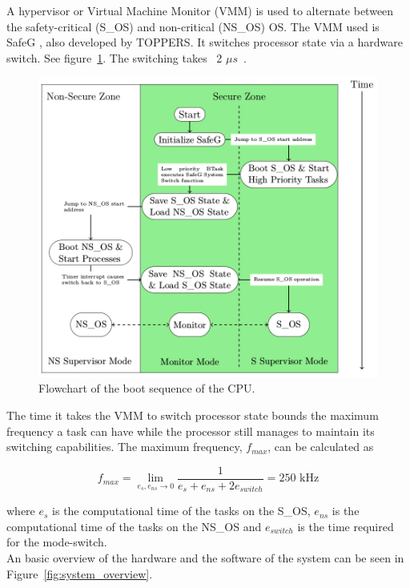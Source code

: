 A hypervisor or Virtual Machine Monitor (VMM) is used to alternate between the safety-critical (S\_OS) and non-critical (NS\_OS) OS. The VMM used is SafeG \cite{website:safeg}, also developed by TOPPERS. It switches processor state via a hardware switch. See figure~\ref{fig:modeswitch}. The switching takes ~2 $\mu s$~\cite{safegswitch}.

\begin{figure}[H]
\centering
\includegraphics[width=\textwidth]{./img/literature_modeswitch.png}
\caption{Flowchart of the boot sequence of the CPU. \cite{zaki2016}}\label{fig:modeswitch}
\end{figure}

The time it takes the VMM to switch processor state bounds the maximum frequency a task can have while the processor still manages to maintain its switching capabilities. The maximum frequency, $f_{max}$, can be calculated as

$$f_{max} = \lim_{e_s, e_{ns} \to 0} \frac{1}{e_s+e_{ns}+2e_{switch}} = 250\textrm{ kHz}$$

where $e_s$ is the computational time of the tasks on the S\_OS, $e_{ns}$ is the computational time of the tasks on the NS\_OS and $e_{switch}$ is the time required for the mode-switch.\\

An basic overview of the hardware and the software of the system can be seen in Figure~\ref{fig:system_overview}.

